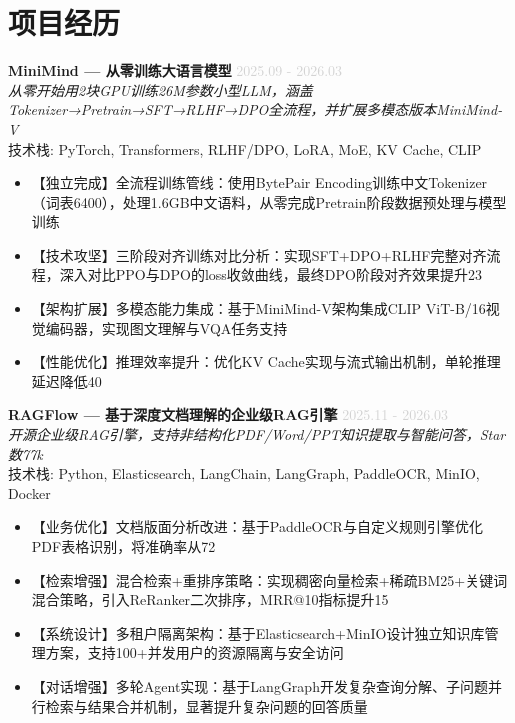 \documentclass[11pt,a4paper]{article}
\begin{document}
\section{项目经历}

\noindent\textbf{MiniMind — 从零训练大语言模型} \hfill \textcolor{lightgray}{2025.09 - 2026.03}\\
\textit{从零开始用2块GPU训练26M参数小型LLM，涵盖Tokenizer→Pretrain→SFT→RLHF→DPO全流程，并扩展多模态版本MiniMind-V}\\
技术栈: PyTorch, Transformers, RLHF/DPO, LoRA, MoE, KV Cache, CLIP
\begin{itemize}

  \item 【独立完成】全流程训练管线：使用BytePair Encoding训练中文Tokenizer（词表6400），处理1.6GB中文语料，从零完成Pretrain阶段数据预处理与模型训练

  \item 【技术攻坚】三阶段对齐训练对比分析：实现SFT+DPO+RLHF完整对齐流程，深入对比PPO与DPO的loss收敛曲线，最终DPO阶段对齐效果提升23%

  \item 【架构扩展】多模态能力集成：基于MiniMind-V架构集成CLIP ViT-B/16视觉编码器，实现图文理解与VQA任务支持

  \item 【性能优化】推理效率提升：优化KV Cache实现与流式输出机制，单轮推理延迟降低40%

\end{itemize}


\noindent\textbf{RAGFlow — 基于深度文档理解的企业级RAG引擎} \hfill \textcolor{lightgray}{2025.11 - 2026.03}\\
\textit{开源企业级RAG引擎，支持非结构化PDF/Word/PPT知识提取与智能问答，Star数77k}\\
技术栈: Python, Elasticsearch, LangChain, LangGraph, PaddleOCR, MinIO, Docker
\begin{itemize}

  \item 【业务优化】文档版面分析改进：基于PaddleOCR与自定义规则引擎优化PDF表格识别，将准确率从72%

  \item 【检索增强】混合检索+重排序策略：实现稠密向量检索+稀疏BM25+关键词混合策略，引入ReRanker二次排序，MRR@10指标提升15%

  \item 【系统设计】多租户隔离架构：基于Elasticsearch+MinIO设计独立知识库管理方案，支持100+并发用户的资源隔离与安全访问

  \item 【对话增强】多轮Agent实现：基于LangGraph开发复杂查询分解、子问题并行检索与结果合并机制，显著提升复杂问题的回答质量

\end{itemize}
\end{document}
